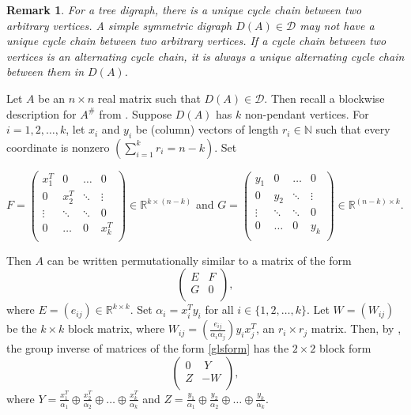 \documentclass[notitlepage,12pt,reqno]{amsart}
\newtheorem{rem}[thm]{Remark}
\numberwithin{equation}{section}
\begin{document}
\begin{rem}
For a tree digraph, there is a unique cycle chain between two arbitrary vertices. A simple symmetric digraph $D(A)\in \mathcal{D}$ may not have a unique cycle chain between two arbitrary vertices. If a cycle chain between two vertices is an alternating cycle chain, it is always a unique alternating cycle chain between them in $D(A)$.
\end{rem}
Let $A$ be an $n\times n$ real matrix such that $D(A)\in \mathcal{D}$. Then recall a blockwise description for $A^{\#}$ from \cite{mcdonald}. Suppose $D(A)$ has $k$ non-pendant vertices. For $i=1,2,\ldots ,k$, let $x_i$ and $y_i$ be (column) vectors of length $r_i \in \mathbb{N}$ such that every coordinate is nonzero $(\sum _{i=1}^kr_i=n-k)$. Set
\begin{center}
 $F=\begin{pmatrix}
x_1^T & 0 & \hdots & 0 \\
0 & x_2^T & \ddots & \vdots \\
\vdots & \ddots & \ddots & 0 \\
0 & \hdots & 0 & x_k^T \\
\end{pmatrix}\in \mathbb{R}^{k\times (n-k)}$ and $G=\begin{pmatrix}
y_1 & 0 & \hdots & 0 \\
0 & y_2 & \ddots & \vdots \\
\vdots & \ddots & \ddots & 0 \\
0 & \hdots & 0 & y_k \\
\end{pmatrix}\in \mathbb{R}^{(n-k)\times k}$.
\end{center}
Then $A$ can be written permutationally similar to a matrix of the form \begin{equation}\label{glsform}
\begin{pmatrix}
E & F  \\
G & 0 \\
\end{pmatrix},
\end{equation}
where $E=(e_{ij})\in \mathbb{R}^{k\times k}$. Set $\alpha _i=x_i^Ty_i$ for all $i\in \{1,2,\ldots ,k\}$. Let $W=(W_{ij})$ be the $k \times k$ block matrix, where $W_{ij}=(\frac{e_{ij}}{\alpha _i\alpha _j})y_ix_j^T$, an $r_i\times r_j$ matrix. Then, by \cite[Theorem 2.5]{mcdonald}, the group inverse of matrices of the form \ref{glsform} has the $2\times 2$ block form
\begin{equation}\label{gigls}
\begin{pmatrix}
0 & ~Y  \\
Z & -W \\
\end{pmatrix},
\end{equation}
where $Y=\frac{x_1^T}{\alpha _1}\oplus \frac{x_2^T}{\alpha _2}\oplus \ldots \oplus \frac{x_k^T}{\alpha _k}$ and $Z=\frac{y_1}{\alpha _1}\oplus \frac{y_2}{\alpha _2}\oplus \ldots \oplus \frac{y_k}{\alpha _k}$.
\end{document}
